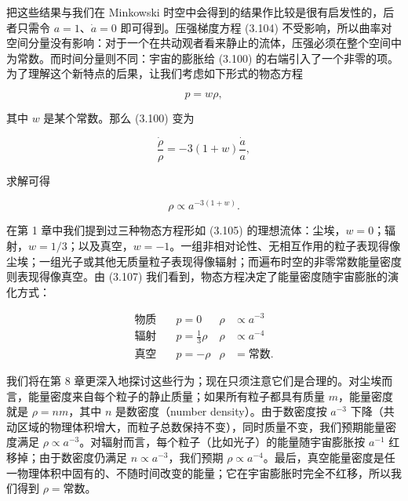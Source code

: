 把这些结果与我们在 Minkowski 时空中会得到的结果作比较是很有启发性的，后者只需令 $a=1$、$\dot a =0$ 即可得到。压强梯度方程 (3.104) 不受影响，所以曲率对空间分量没有影响：对于一个在共动观者看来静止的流体，压强必须在整个空间中为常数。而时间分量则不同：宇宙的膨胀给 (3.100) 的右端引入了一个非零的项。为了理解这个新特点的后果，让我们考虑如下形式的物态方程

\begin{equation*}
p = w\rho, \tag{3.105}
\end{equation*}

其中 $w$ 是某个常数。那么 (3.100) 变为

\begin{equation*}
\frac{\dot\rho}{\rho} = -3(1+w)\frac{\dot a}{a}, \tag{3.106}
\end{equation*}

求解可得

\begin{equation*}
\rho \propto a^{-3(1+w)}. \tag{3.107}
\end{equation*}

在第 1 章中我们提到过三种物态方程形如 (3.105) 的理想流体：尘埃，$w=0$；辐射，$w=1/3$；以及真空，$w=-1$。一组非相对论性、无相互作用的粒子表现得像尘埃；一组光子或其他无质量粒子表现得像辐射；而遍布时空的非零常数能量密度则表现得像真空。由 (3.107) 我们看到，物态方程决定了能量密度随宇宙膨胀的演化方式：

\begin{align*}
\text{物质}\quad & p = 0 & \rho &\propto a^{-3}\\
\text{辐射}\quad & p = \tfrac{1}{3}\rho & \rho &\propto a^{-4}\\
\text{真空}\quad & p = -\rho & \rho &= \text{常数}. \tag{3.108}
\end{align*}

我们将在第 8 章更深入地探讨这些行为；现在只须注意它们是合理的。对尘埃而言，能量密度来自每个粒子的静止质量；如果所有粒子都具有质量 $m$，能量密度就是 $\rho = nm$，其中 $n$ 是数密度（number density）。由于数密度按 $a^{-3}$ 下降（共动区域的物理体积增大，而粒子总数保持不变），同时质量不变，我们预期能量密度满足 $\rho \propto a^{-3}$。对辐射而言，每个粒子（比如光子）的能量随宇宙膨胀按 $a^{-1}$ 红移掉；由于数密度仍满足 $n \propto a^{-3}$，我们预期 $\rho \propto a^{-4}$。最后，真空能量密度是任一物理体积中固有的、不随时间改变的能量；它在宇宙膨胀时完全不红移，所以我们得到 $\rho = \text{常数}$。

